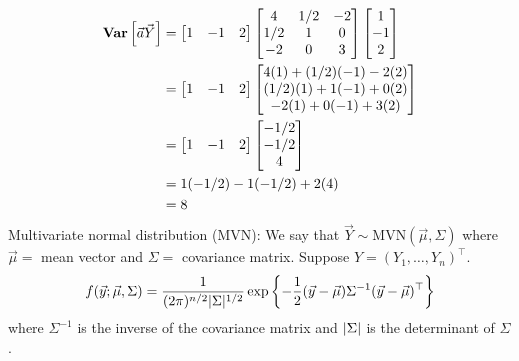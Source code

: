 \begin{align*}
    \bm{\mathrm{Var}}\left[\vec{a}\vec{Y}\right]
     & =
    \begin{bmatrix}
        1 & -1 & 2
    \end{bmatrix}
    \begin{bmatrix}
        4   & 1/2 & -2 \\
        1/2 & 1   & 0  \\
        -2  & 0   & 3
    \end{bmatrix}
    \begin{bmatrix}
        1  \\
        -1 \\
        2
    \end{bmatrix}     \\
     & =
    \begin{bmatrix}
        1 & -1 & 2
    \end{bmatrix}
    \begin{bmatrix}
        4(1)+(1/2)(-1)-2(2) \\
        (1/2)(1)+1(-1)+0(2) \\
        -2(1)+0(-1)+3(2)
    \end{bmatrix}     \\
     & =\begin{bmatrix}
        1 & -1 & 2
    \end{bmatrix}
    \begin{bmatrix}
        -1/2 \\
        -1/2 \\
        4
    \end{bmatrix}     \\
     & =1(-1/2)-1(-1/2)+2(4)       \\
     & =8
\end{align*}
Multivariate normal distribution (MVN):
We say that $ \vec{Y} \sim \text{MVN}(\vec{\mu},\Sigma) $
where $ \vec{\mu}= $ mean vector and $ \Sigma= $
covariance matrix. Suppose $ Y=(Y_1,\ldots,Y_n)^\top $.
\[ f(\vec{y};\vec{\mu},\Sigma)=
    \frac{1}{(2\pi)^{n/2}\lvert\Sigma\rvert^{1/2}}
    \exp\left\{ -\frac{1}{2}(\vec{y}-\vec{\mu})
    \Sigma^{-1}(\vec{y}-\vec{\mu})^\top \right\}  \]
where $ \Sigma^{-1} $ is the inverse of the covariance matrix
and $ \lvert\Sigma\rvert $ is the determinant of $ \Sigma $.

